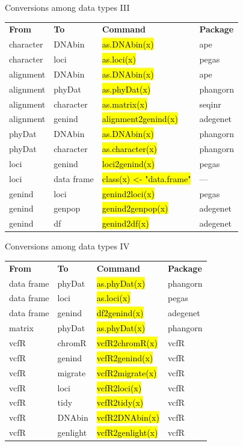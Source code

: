 \documentclass[compress, ucs, xelatex, 11pt, xcolor=svgnames,
  hyperref={
    bookmarks=true,
    unicode=true,
    colorlinks=true,
    pdftitle={Molecular data in R},
    plainpages=false,
    pdfauthor={Vojtech Zeisek},
    pdfsubject={Course about phylogeny and evolution in R},
    pdfcreator={XeLaTeX},
    pdfkeywords={R, evolution, phylogeny, molecular data},
    linkcolor=Tomato,
    anchorcolor=SaddleBrown,
    citecolor=Goldenrod,
    filecolor=DarkMagenta,
    menucolor=Sienna,
    urlcolor=DarkTurquoise,
    pdftex},
  url={hyphens, lowtilde} %
  ]{beamer}
\renewcommand{\texttt}[1]{\hl{\ttfamily #1}}
\begin{document}
\begin{frame}{Conversions among data types III}
  \begin{tabular}{llll}
    \textbf{From} & \textbf{To} & \textbf{Command} & \textbf{Package}\\
    character & DNAbin & \texttt{as.DNAbin(x)} & ape\\
    character & loci & \texttt{as.loci(x)} & pegas\\
    alignment & DNAbin & \texttt{as.DNAbin(x)} & ape\\
    alignment & phyDat & \texttt{as.phyDat(x)} & phangorn\\
    alignment & character & \texttt{as.matrix(x)} & seqinr\\
    alignment & genind & \texttt{alignment2genind(x)} & adegenet\\
    phyDat & DNAbin & \texttt{as.DNAbin(x)} & phangorn\\
    phyDat & character & \texttt{as.character(x)} & phangorn\\
    loci & genind & \texttt{loci2genind(x)} & pegas\\
    loci & data frame & \texttt{class(x) <- "data.frame"} & --- \\
    genind & loci & \texttt{genind2loci(x)} & pegas\\
    genind & genpop & \texttt{genind2genpop(x)} & adegenet\\
    genind & df & \texttt{genind2df(x)} & adegenet
  \end{tabular}
\end{frame}

\begin{frame}{Conversions among data types IV}
  \begin{tabular}{llll}
    \textbf{From} & \textbf{To} & \textbf{Command} & \textbf{Package}\\
    data frame & phyDat & \texttt{as.phyDat(x)} & phangorn\\
    data frame & loci & \texttt{as.loci(x)} & pegas\\
    data frame & genind & \texttt{df2genind(x)} & adegenet\\
    matrix & phyDat & \texttt{as.phyDat(x)} & phangorn\\
    vcfR & chromR & \texttt{vcfR2chromR(x)} & vcfR\\
    vcfR & genind & \texttt{vcfR2genind(x)} & vcfR\\
    vcfR & migrate & \texttt{vcfR2migrate(x)} & vcfR\\
    vcfR & loci & \texttt{vcfR2loci(x)} & vcfR\\
    vcfR & tidy & \texttt{vcfR2tidy(x)} & vcfR\\
    vcfR & DNAbin & \texttt{vcfR2DNAbin(x)} & vcfR\\
    vcfR & genlight & \texttt{vcfR2genlight(x)} & vcfR
  \end{tabular}
\end{frame}
\end{document}
